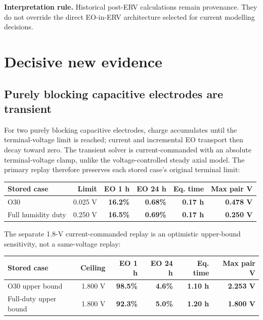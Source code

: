 \documentclass[10pt,a4paper]{article}
\begin{document}
\begin{warningbox}
\textbf{Interpretation rule.} Historical post-ERV calculations remain
provenance. They do not override the direct EO-in-ERV architecture selected for
current modelling decisions.
\end{warningbox}

\clearpage
\section{Decisive new evidence}
\subsection{Purely blocking capacitive electrodes are transient}

For two purely blocking capacitive electrodes, charge accumulates until the
terminal-voltage limit is reached; current and incremental EO transport then
decay toward zero. The transient solver is current-commanded with an absolute
terminal-voltage clamp, unlike the voltage-controlled steady axial model. The
primary replay therefore preserves each stored case's original terminal limit:

\begin{center}\small
\begin{tabularx}{\textwidth}{@{}Yrrrrr@{}}
\toprule
\textbf{Stored case} & \textbf{Limit} & \textbf{EO 1 h} & \textbf{EO 24 h} & \textbf{Eq. time} & \textbf{Max pair V} \\
\midrule
O30 & 0.025 V & \textbf{16.2\%} & \textbf{0.68\%} & \textbf{0.17 h} & \textbf{0.478 V} \\
Full humidity duty & 0.250 V & \textbf{16.5\%} & \textbf{0.69\%} & \textbf{0.17 h} & \textbf{0.250 V} \\
\bottomrule
\end{tabularx}
\end{center}

The separate 1.8-V current-commanded replay is an optimistic upper-bound
sensitivity, not a same-voltage replay:

\begin{center}\small
\begin{tabularx}{\textwidth}{@{}Yrrrrr@{}}
\toprule
\textbf{Stored case} & \textbf{Ceiling} & \textbf{EO 1 h} & \textbf{EO 24 h} & \textbf{Eq. time} & \textbf{Max pair V} \\
\midrule
O30 upper bound & 1.800 V & \textbf{98.5\%} & \textbf{4.6\%} & \textbf{1.10 h} & \textbf{2.253 V} \\
Full-duty upper bound & 1.800 V & \textbf{92.3\%} & \textbf{5.0\%} & \textbf{1.20 h} & \textbf{1.800 V} \\
\bottomrule
\end{tabularx}
\end{center}
\end{document}
